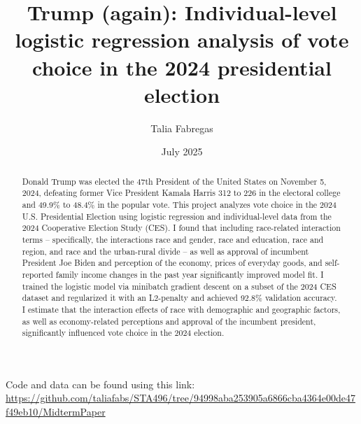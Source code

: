 \documentclass[letter]{article}
\title{Trump (again): Individual-level logistic regression analysis of vote choice in the 2024 presidential election}
\author{Talia Fabregas}
\date{July 2025}
\begin{document}
\maketitle
\begin{abstract} Donald Trump was elected the 47th President of the United States on November 5, 2024, defeating former Vice President Kamala Harris 312 to 226 in the electoral college and 49.9\% to 48.4\% in the popular vote. This project analyzes vote choice in the 2024 U.S. Presidential Election using logistic regression and individual-level data from the 2024 Cooperative Election Study (CES). I found that including race-related interaction terms – specifically, the interactions race and gender, race and education, race and region, and race and the urban-rural divide – as well as approval of incumbent President Joe Biden and perception of the economy, prices of everyday goods, and self-reported family income changes in the past year significantly improved model fit. I trained the logistic model via minibatch gradient descent on a subset of the 2024 CES dataset and regularized it with an L2-penalty and achieved 92.8\% validation accuracy. I estimate that the interaction effects of race with demographic and geographic factors, as well as economy-related perceptions and approval of the incumbent president, significantly influenced vote choice in the 2024 election.\end{abstract}
Code and data can be found using this link: \\
\href{link}{https://github.com/taliafabs/STA496/tree/94998aba253905a6866cba4364e00de47f49eb10/MidtermPaper}
\end{document}
